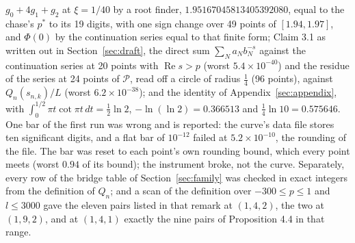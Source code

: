 \documentclass[11pt]{article}
\newcommand{\re}{\operatorname{Re}}
\begin{document}
$g_0+4g_1+g_2$ at $\xi=1/40$ by a root finder, $1.95167045813405392080$, equal to the chase's $p^*$ to its 19 digits, with one sign change over 49 points of $[1.94,1.97]$, and $\Phi(0)$ by the continuation series equal to that finite form; Claim 3.1 as written out in Section~\ref{sec:draft}, the direct sum $\sum_Na_Nb_N^{-s}$ against the continuation series at 20 points with $\re s>p$ (worst $5.4\times10^{-40}$) and the residue of the series at 24 points of $\mathcal{P}$, read off a circle of radius $\frac14$ (96 points), against $Q_n(s_{n,k})/L$ (worst $6.2\times10^{-38}$); and the identity of Appendix~\ref{sec:appendix}, with $\int_0^{1/2}\pi t\cot\pi t\,dt=\frac12\ln2$, $-\ln(\ln2)=0.366513$ and $\frac14\ln10=0.575646$. One bar of the first run was wrong and is reported: the curve's data file stores ten significant digits, and a flat bar of $10^{-12}$ failed at $5.2\times10^{-10}$, the rounding of the file. The bar was reset to each point's own rounding bound, which every point meets (worst $0.94$ of its bound); the instrument broke, not the curve. Separately, every row of the bridge table of Section~\ref{sec:family} was checked in exact integers from the definition of $Q_n$; and a scan of the definition over $-300\le p\le1$ and $l\le3000$ gave the eleven pairs listed in that remark at $(1,4,2)$, the two at $(1,9,2)$, and at $(1,4,1)$ exactly the nine pairs of Proposition 4.4 in that range.
\end{document}
